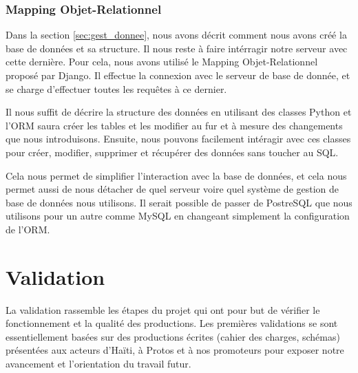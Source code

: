 \documentclass{EPL-master-thesis-covers-FR}
\begin{document}
			\subsection{Mapping Objet-Relationnel}

				Dans la section \ref{sec:gest_donnee}, nous avons décrit comment nous avons créé la base de données et sa structure. Il nous reste à faire intérragir notre serveur avec cette dernière. Pour cela, nous avons utilisé le Mapping Objet-Relationnel proposé par Django. Il effectue la connexion avec le serveur de base de donnée, et se charge d'effectuer toutes les requêtes à ce dernier.

				Il nous suffit de décrire la structure des données en utilisant des classes Python et l'ORM saura créer les tables et les modifier au fur et à mesure des changements que nous introduisons. Ensuite, nous pouvons facilement intéragir avec ces classes pour créer, modifier, supprimer et récupérer des données sans toucher au SQL.

				Cela nous permet de simplifier l'interaction avec la base de données, et cela nous permet aussi de nous détacher de quel serveur voire quel système de gestion de base de données nous utilisons. Il serait possible de passer de PostreSQL que nous utilisons pour un autre comme MySQL en changeant simplement la configuration de l'ORM.


	\chapter{Validation}

		La validation rassemble les étapes du projet qui ont pour but de vérifier le fonctionnement et la qualité des productions. Les premières validations se sont essentiellement basées sur des productions écrites (cahier des charges, schémas) présentées aux acteurs d'Haïti, à Protos et à nos promoteurs pour exposer notre avancement et l'orientation du travail futur.
\end{document}
